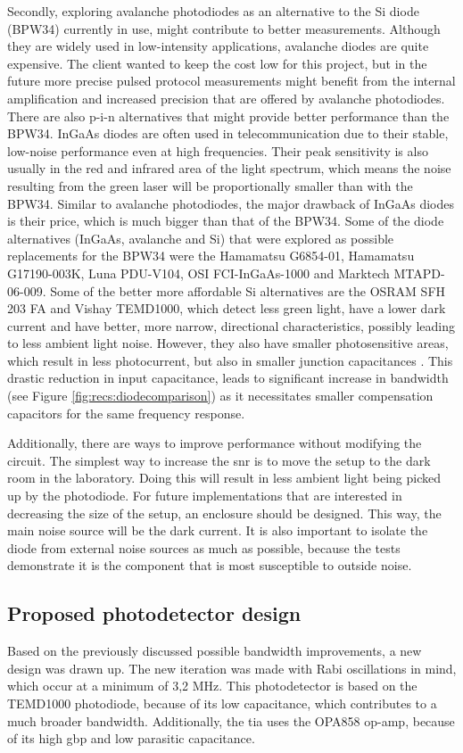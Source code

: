 Secondly, exploring avalanche photodiodes as an alternative to the Si diode (BPW34) currently in use, might contribute to better measurements. Although they are widely used in low-intensity applications, avalanche diodes are quite expensive. The client wanted to keep the cost low for this project, but in the future more precise pulsed protocol measurements might benefit from the internal amplification and increased precision that are offered by avalanche photodiodes. There are also p-i-n alternatives that might provide better performance than the BPW34. InGaAs diodes are often used in telecommunication due to their stable, low-noise performance even at high frequencies. Their peak sensitivity is also usually in the red and infrared area of the light spectrum, which means the noise resulting from the green laser will be proportionally smaller than with the BPW34. Similar to avalanche photodiodes, the major drawback of InGaAs diodes is their price, which is much bigger than that of the BPW34. Some of the diode alternatives (InGaAs, avalanche and Si) that were explored as possible replacements for the BPW34 were the Hamamatsu G6854-01, Hamamatsu G17190-003K, Luna PDU-V104, OSI FCI-InGaAs-1000 and Marktech MTAPD-06-009. Some of the better more affordable Si alternatives are the OSRAM SFH 203 FA and Vishay TEMD1000, which detect less green light, have a lower dark current and have better, more narrow, directional characteristics, possibly leading to less ambient light noise. However, they also have smaller photosensitive areas, which result in less photocurrent, but also in smaller junction capacitances \cite{hm2025si, lt2006area}. This drastic reduction in input capacitance, leads to significant increase in bandwidth (see Figure \ref{fig:recs:diodecomparison}) as it necessitates smaller compensation capacitors for the same frequency response.


Additionally, there are ways to improve performance without modifying the circuit. The simplest way to increase the \gls{snr} is to move the setup to the dark room in the laboratory. Doing this will result in less ambient light being picked up by the photodiode. For future implementations that are interested in decreasing the size of the setup, an enclosure should be designed. This way, the main noise source will be the dark current. It is also important to isolate the diode from external noise sources as much as possible, because the tests demonstrate it is the component that is most susceptible to outside noise.

\subsection{Proposed  photodetector design}
Based on the previously discussed possible bandwidth improvements, a new design was drawn up. The new iteration was made with Rabi oscillations in mind, which occur at a minimum of 3,2 \unit{\mega\hertz}. This photodetector is based on the TEMD1000 photodiode, because of its low capacitance, which contributes to a much broader bandwidth. Additionally, the \gls{tia} uses the OPA858 op-amp, because of its high \gls{gbp} and low parasitic capacitance. 

